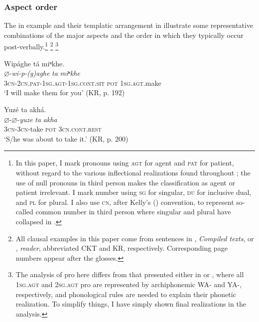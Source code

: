 \documentclass[output=paper]{LSP/langsci}
\begin{document}
\subsubsection{Aspect order} 

The  in example  and their templatic arrangement in  illustrate some representative combinations of the major aspects and the order in which they typically occur post-verbally.\footnote{In this paper, I mark pronouns using \textsc{agt} for agent and \textsc{pat} for patient, without regard to the various inflectional realizations found throughout ; the use of null pronouns in third person makes the classification as agent or patient irrelevant. I mark number using \textsc{sg} for singular, \textsc{du} for inclusive dual, and \textsc{pl} for plural. I also use \textsc{cn}, after Kelly's (\citeyear{Kelly1992})   convention, to represent so-called common number in third person where singular and plural have collapsed in .} \footnote{All clausal examples in this paper come from sentences in  \citet{McBrideCumberland2009}, \textit{Compiled  texts}, or \citet{McBrideCumberland2010}, \textit{ reader}, abbreviated CKT and KR, respectively. Corresponding page numbers appear after the  glosses.} \footnote{The analysis of pro here differs from that presented either in \citet{Quintero2004} or \citet{Rankin2005b}, where all \textsc{1sg.agt} and \textsc{2sg.agt} pro are represented by archiphonemic WA- and YA-, respectively, and phonological rules are needed to explain their phonetic realization. To simplify things, I have simply shown final realizations in the analysis.}

\ea\label{postverbalorder}

\ea\label{postverbalorder1}{Wipághe tá miⁿkhe.\\ 
\gll
$\varnothing$-\textit{wi-p-(g)aghe}  \textit{ta}  \textit{miⁿkhe} \\
 \textsc{3cn-2cn.pat-1sg.agt-1sg.cont.sit}   \textsc{pot}   \textsc{1sg.agt}.make \\
\glt  `I will make them for you' (KR, p. 192) \\
}

\ex\label{postverbalorder2}{Yuz\'e ta akhá.\\ 
\gll
$\varnothing$-$\varnothing$-\textit{yuze}   \textit{ta}  \textit{akha} \\
\textsc{3cn-3cn}-take  \textsc{pot}  \textsc{3cn.cont.rest} \\
\glt  `S/he was about to take it.' (KR, p. 200) \\
}
\end{document}
